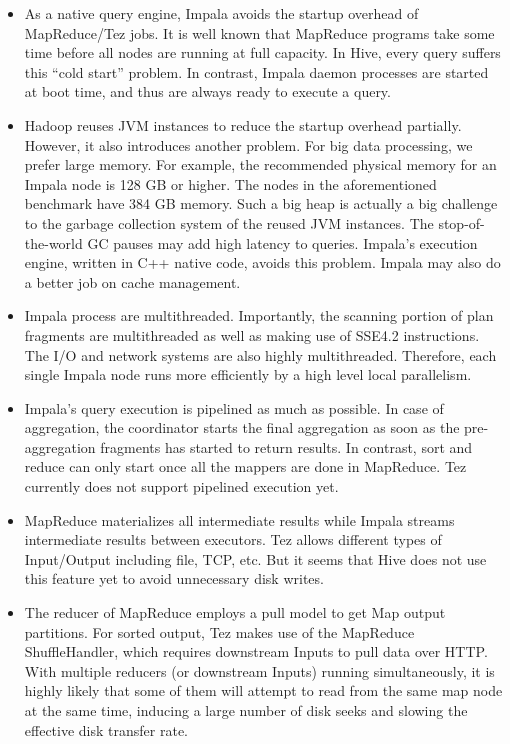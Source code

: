 \documentclass[11pt]{book}
\begin{document}
\begin{itemize}
\item As a native query engine, Impala avoids the startup overhead of MapReduce/Tez jobs. It is well known that MapReduce programs take some time before all nodes are running at full capacity. In Hive, every query suffers this ``cold start'' problem. In contrast, Impala daemon processes are started at boot time, and thus are always ready to execute a query.
\item Hadoop reuses JVM instances to reduce the startup overhead partially. However, it also introduces another problem. For big data processing, we prefer large memory. For example, the recommended physical memory for an Impala node is 128 GB or higher. The nodes in the aforementioned benchmark have 384 GB memory. Such a big heap is actually a big challenge to the garbage collection system of the reused JVM instances. The stop-of-the-world GC pauses may add high latency to queries. Impala's execution engine, written in C++ native code, avoids this problem. Impala may also do a better job on cache management.
\item Impala process are multithreaded. Importantly, the scanning portion of plan fragments are multithreaded as well as making use of SSE4.2 instructions. The I/O and network systems are also highly multithreaded. Therefore, each single Impala node runs more efficiently by a high level local parallelism. 
\item Impala's query execution is pipelined as much as possible. In case of aggregation, the coordinator starts the final aggregation as soon as the pre-aggregation fragments has started to return results. In contrast, sort and reduce can only start once all the mappers are done in MapReduce. Tez currently does not support pipelined execution yet.
\item MapReduce materializes all intermediate results while Impala streams intermediate results between executors. Tez allows different types of Input/Output including file, TCP, etc. But it seems that Hive does not use this feature yet to avoid unnecessary disk writes.
\item The reducer of MapReduce employs a pull model to get Map output partitions. For sorted output, Tez makes use of the MapReduce ShuffleHandler, which requires downstream Inputs to pull data over HTTP. With multiple reducers (or downstream Inputs) running simultaneously, it is highly likely that some of them will attempt to read from the same map node at the same time, inducing a large number of disk seeks and slowing the effective disk transfer rate.

\end{itemize}
\end{document}
